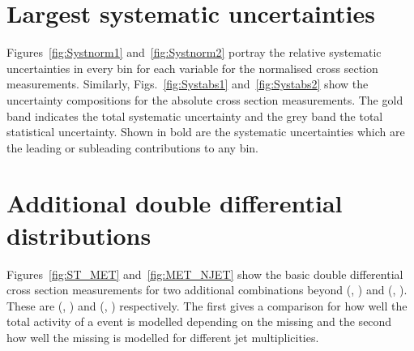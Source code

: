 \chapter{Largest systematic uncertainties} %
\label{ch:systApp}

Figures~\ref{fig:Systnorm1} and~\ref{fig:Systnorm2} portray the relative systematic uncertainties in every bin for each variable for the normalised cross section measurements.
Similarly, Figs.~\ref{fig:Systabs1} and~\ref{fig:Systabs2} show the uncertainty compositions for the absolute cross section measurements.
The gold band indicates the total systematic uncertainty and the grey band the total statistical uncertainty.
Shown in bold are the systematic uncertainties which are the leading or subleading contributions to any bin.
 


\chapter{Additional double differential distributions} %
\label{ch:DD}
Figures~\ref{fig:ST_MET} and~\ref{fig:MET_NJET} show the basic double differential cross section measurements for two additional combinations beyond (\ST{}, \NJET{}) and (\LPT{}, \LETA{}).
These are (\ST{}, \MET{}) and (\MET{}, \NJET{}) respectively.
The first gives a comparison for how well the total activity of a \ttbar{} event is modelled depending on the missing \pt{} and the second how well the missing \pt{} is modelled for different jet multiplicities.

